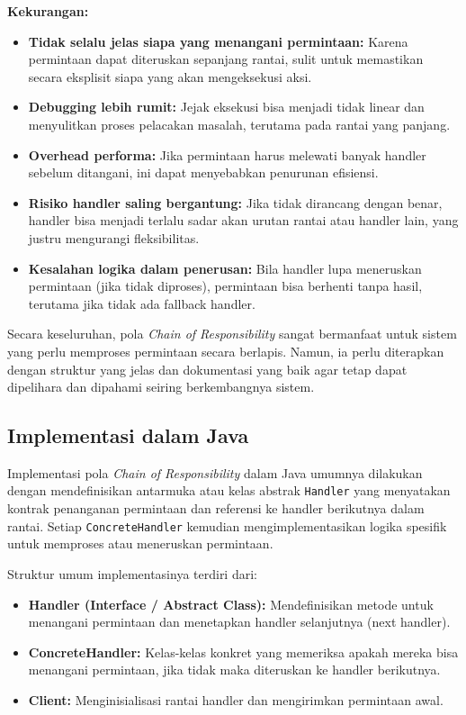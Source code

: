 \textbf{Kekurangan:}
\begin{itemize}
	\item \textbf{Tidak selalu jelas siapa yang menangani permintaan:} Karena permintaan dapat diteruskan sepanjang rantai, sulit untuk memastikan secara eksplisit siapa yang akan mengeksekusi aksi.
	\item \textbf{Debugging lebih rumit:} Jejak eksekusi bisa menjadi tidak linear dan menyulitkan proses pelacakan masalah, terutama pada rantai yang panjang.
	\item \textbf{Overhead performa:} Jika permintaan harus melewati banyak handler sebelum ditangani, ini dapat menyebabkan penurunan efisiensi.
	\item \textbf{Risiko handler saling bergantung:} Jika tidak dirancang dengan benar, handler bisa menjadi terlalu sadar akan urutan rantai atau handler lain, yang justru mengurangi fleksibilitas.
	\item \textbf{Kesalahan logika dalam penerusan:} Bila handler lupa meneruskan permintaan (jika tidak diproses), permintaan bisa berhenti tanpa hasil, terutama jika tidak ada fallback handler.
\end{itemize}

Secara keseluruhan, pola \textit{Chain of Responsibility} sangat bermanfaat untuk sistem yang perlu memproses permintaan secara berlapis. Namun, ia perlu diterapkan dengan struktur yang jelas dan dokumentasi yang baik agar tetap dapat dipelihara dan dipahami seiring berkembangnya sistem.


\subsection{Implementasi dalam Java}

Implementasi pola \textit{Chain of Responsibility} dalam Java umumnya dilakukan dengan mendefinisikan antarmuka atau kelas abstrak \texttt{Handler} yang menyatakan kontrak penanganan permintaan dan referensi ke handler berikutnya dalam rantai. Setiap \texttt{ConcreteHandler} kemudian mengimplementasikan logika spesifik untuk memproses atau meneruskan permintaan.

Struktur umum implementasinya terdiri dari:

\begin{itemize}
	\item \textbf{Handler (Interface / Abstract Class):} Mendefinisikan metode untuk menangani permintaan dan menetapkan handler selanjutnya (next handler).
	\item \textbf{ConcreteHandler:} Kelas-kelas konkret yang memeriksa apakah mereka bisa menangani permintaan, jika tidak maka diteruskan ke handler berikutnya.
	\item \textbf{Client:} Menginisialisasi rantai handler dan mengirimkan permintaan awal.
\end{itemize}


